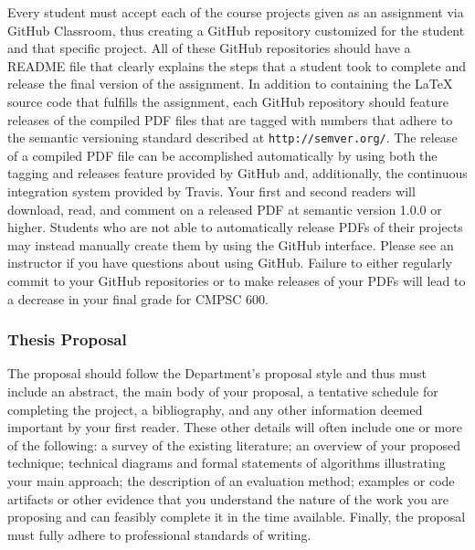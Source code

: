 \documentclass[11pt]{article}
\newcommand{\url}[1]{\lstinline{#1}}
\begin{document}
Every student must accept each of the course projects given as an assignment via GitHub Classroom, thus creating a GitHub repository customized for the student and that specific project. All of these GitHub repositories should have a README file that clearly explains the steps that a student took to complete and release the final version of the assignment. In addition to containing the \LaTeX{} source code that fulfills the assignment, each GitHub repository should feature releases of the compiled PDF files that are tagged with numbers that adhere to the semantic versioning standard described at \url{http://semver.org/}. The release of a compiled PDF file can be accomplished automatically by using both the tagging and releases feature provided by GitHub and, additionally, the continuous integration system provided by Travis. Your first and second readers will download, read, and comment on a released PDF at semantic version 1.0.0 or higher. Students who are not able to automatically release PDFs of their projects may instead manually create them by using the GitHub interface. Please see an instructor if you have questions about using GitHub. Failure to either regularly commit to your GitHub repositories or
to make releases of your PDFs will lead to a decrease in your final grade for CMPSC 600.

\subsubsection*{Thesis Proposal}

The proposal should follow the Department's proposal style and thus must include an abstract, the main body of your proposal, a tentative schedule for completing the project, a bibliography, and any other information deemed important by your first reader. These other details will often include one or more of the following: a survey of the existing literature; an overview of your proposed technique; technical diagrams and formal statements of algorithms illustrating your main approach; the description of an evaluation method; examples or code artifacts or other evidence that you understand the nature of the work you are proposing and can feasibly complete it in the time available.  Finally, the proposal must fully adhere to professional standards of writing.
\end{document}
